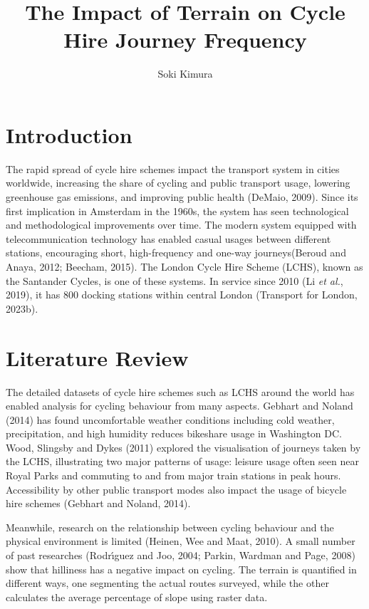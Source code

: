 \documentclass[
  12pt,
  a4paper,
  DIV=11,
  numbers=noendperiod]{scrartcl}
\title{The Impact of Terrain on Cycle Hire Journey Frequency}
\author{Soki Kimura}
\date{}
\begin{document}
\maketitle
\ifdefined\Shaded\renewenvironment{Shaded}{\begin{tcolorbox}[interior hidden, borderline west={3pt}{0pt}{shadecolor}, boxrule=0pt, enhanced, sharp corners, breakable, frame hidden]}{\end{tcolorbox}}\fi

\hypertarget{introduction}{%
\section{Introduction}\label{introduction}}

The rapid spread of cycle hire schemes impact the transport system in
cities worldwide, increasing the share of cycling and public transport
usage, lowering greenhouse gas emissions, and improving public health
(DeMaio, 2009). Since its first implication in Amsterdam in the 1960s,
the system has seen technological and methodological improvements over
time. The modern system equipped with telecommunication technology has
enabled casual usages between different stations, encouraging short,
high-frequency and one-way journeys(Beroud and Anaya, 2012; Beecham,
2015). The London Cycle Hire Scheme (LCHS), known as the Santander
Cycles, is one of these systems. In service since 2010 (Li \emph{et
al.}, 2019), it has 800 docking stations within central London
(Transport for London, 2023b).

\hypertarget{literature-review}{%
\section{Literature Review}\label{literature-review}}

The detailed datasets of cycle hire schemes such as LCHS around the
world has enabled analysis for cycling behaviour from many aspects.
Gebhart and Noland (2014) has found uncomfortable weather conditions
including cold weather, precipitation, and high humidity reduces
bikeshare usage in Washington DC. Wood, Slingsby and Dykes (2011)
explored the visualisation of journeys taken by the LCHS, illustrating
two major patterns of usage: leisure usage often seen near Royal Parks
and commuting to and from major train stations in peak hours.
Accessibility by other public transport modes also impact the usage of
bicycle hire schemes (Gebhart and Noland, 2014).

Meanwhile, research on the relationship between cycling behaviour and
the physical environment is limited (Heinen, Wee and Maat, 2010). A
small number of past researches (Rodrı́guez and Joo, 2004; Parkin,
Wardman and Page, 2008) show that hilliness has a negative impact on
cycling. The terrain is quantified in different ways, one segmenting the
actual routes surveyed, while the other calculates the average
percentage of slope using raster data.
\end{document}
